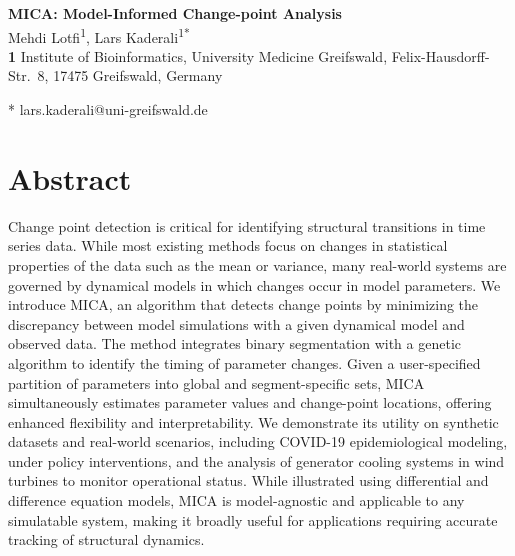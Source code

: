 \documentclass[10pt,letterpaper]{article}
\begin{document}
\begin{flushleft}
{\Large
\textbf{MICA: Model-Informed Change-point Analysis}
}
\newline
\\
Mehdi Lotfi\textsuperscript{1},
Lars Kaderali\textsuperscript{1*}
\\
\bigskip
\textbf{1} Institute of Bioinformatics, University Medicine Greifswald, Felix-Hausdorff-Str.~8, 17475 Greifswald, Germany
\\
\bigskip

* lars.kaderali@uni-greifswald.de

\end{flushleft}


\section*{Abstract}
Change point detection is critical for identifying structural transitions in time series data. While most existing methods focus on changes in statistical properties of the data such as the mean or variance, many real-world systems are governed by dynamical models in which changes occur in model parameters. We introduce MICA, an algorithm that detects change points by minimizing the discrepancy between model simulations with a given dynamical model and observed data. The method integrates binary segmentation with a genetic algorithm to identify the timing of parameter changes. Given a user-specified partition of parameters into global and segment-specific sets, MICA simultaneously estimates parameter values and change-point locations, offering enhanced flexibility and interpretability. We demonstrate its utility on synthetic datasets and real-world scenarios, including COVID-19 epidemiological modeling, under policy interventions, and the analysis of generator cooling systems in wind turbines to monitor operational status. While illustrated using differential and difference equation models, MICA is model-agnostic and applicable to any simulatable system, making it broadly useful for applications requiring accurate tracking of structural dynamics.
\end{document}

